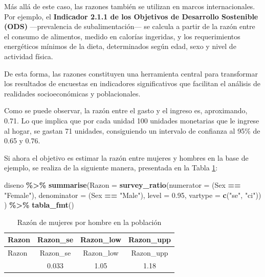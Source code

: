 \documentclass[
  spanish,
  12pt,
]{book}
\newenvironment{Shaded}{\begin{snugshade}}{\end{snugshade}}
\newcommand{\AttributeTok}[1]{\textcolor[rgb]{0.13,0.29,0.53}{#1}}
\newcommand{\FloatTok}[1]{\textcolor[rgb]{0.00,0.00,0.81}{#1}}
\newcommand{\FunctionTok}[1]{\textcolor[rgb]{0.13,0.29,0.53}{\textbf{#1}}}
\newcommand{\NormalTok}[1]{#1}
\newcommand{\SpecialCharTok}[1]{\textcolor[rgb]{0.81,0.36,0.00}{\textbf{#1}}}
\newcommand{\StringTok}[1]{\textcolor[rgb]{0.31,0.60,0.02}{#1}}
\begin{document}
Más allá de este caso, las razones también se utilizan en marcos internacionales. Por ejemplo, el \textbf{Indicador 2.1.1 de los Objetivos de Desarrollo Sostenible (ODS)} ---prevalencia de subalimentación--- se calcula a partir de la razón entre el consumo de alimentos, medido en calorías ingeridas, y los requerimientos energéticos mínimos de la dieta, determinados según edad, sexo y nivel de actividad física.

De esta forma, las razones constituyen una herramienta central para transformar los resultados de encuestas en indicadores significativos que facilitan el análisis de realidades socioeconómicas y poblacionales.

Como se puede observar, la razón entre el gasto y el ingreso es, aproximando, 0.71. Lo que implica que por cada unidad 100 unidades monetarias que le ingrese al hogar, se gastan 71 unidades, consiguiendo un intervalo de confianza al 95\% de 0.65 y 0.76.

Si ahora el objetivo es estimar la razón entre mujeres y hombres en la base de ejemplo, se realiza de la siguiente manera, presentada en la Tabla \ref{tab:tab-razon-sexo}:

\begin{Shaded}
\begin{Highlighting}[]
\NormalTok{diseno }\SpecialCharTok{\%\textgreater{}\%} 
  \FunctionTok{summarise}\NormalTok{(}\AttributeTok{Razon =} \FunctionTok{survey\_ratio}\NormalTok{(}\AttributeTok{numerator =}\NormalTok{ (Sex }\SpecialCharTok{==} \StringTok{"Female"}\NormalTok{),}
                                 \AttributeTok{denominator =}\NormalTok{ (Sex }\SpecialCharTok{==} \StringTok{"Male"}\NormalTok{),}
                                 \AttributeTok{level =} \FloatTok{0.95}\NormalTok{,}
                                 \AttributeTok{vartype =}  \FunctionTok{c}\NormalTok{(}\StringTok{"se"}\NormalTok{, }\StringTok{"ci"}\NormalTok{))}
\NormalTok{            ) }\SpecialCharTok{\%\textgreater{}\%}
  \FunctionTok{tabla\_fmt}\NormalTok{()}
\end{Highlighting}
\end{Shaded}

\begin{longtable}[]{@{}lccc@{}}
\caption{\label{tab:tab-razon-sexo}Razón de mujeres por hombre en la población}\tabularnewline
\toprule\noalign{}
Razon & Razon\_se & Razon\_low & Razon\_upp \\
\midrule\noalign{}
\endfirsthead
\toprule\noalign{}
Razon & Razon\_se & Razon\_low & Razon\_upp \\
\midrule\noalign{}
\endhead
\bottomrule\noalign{}
\endlastfoot
1.11 & 0.033 & 1.05 & 1.18 \\
\end{longtable}
\end{document}
